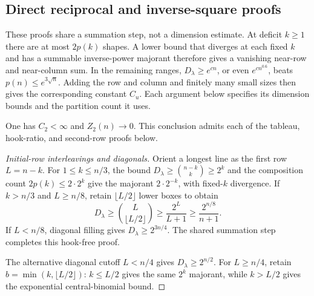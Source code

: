 \subsection{Direct reciprocal and inverse-square proofs}
\label{l:degree-direct-routes}

These proofs share a summation step, not a dimension estimate.
At deficit $k\ge1$ there are at most $2p(k)$ shapes. A lower bound
that diverges at each fixed $k$ and has a summable inverse-power
majorant therefore gives a vanishing near-row and near-column sum.
In the remaining ranges, $D_\lambda\ge e^{cn}$, or even
$e^{cn^{0.6}}$, beats $p(n)\le e^{3\sqrt n}$.
Adding the row and column and finitely many small sizes then gives
the corresponding constant $C_u$. Each argument below specifies
its dimension bounds and the partition count it uses.

\begin{lemma}
\label{l:degree-inverse-square}\label{l:degree-reciprocal-two}
One has $C_2<\infty$ and $Z_2(n)\to0$. This conclusion admits
each of the tableau, hook-ratio, and second-row proofs below.
\end{lemma}
\begin{proof}[Initial-row interleavings and diagonals]
Orient a longest line as the first row $L=n-k$.
For $1\le k\le n/3$, the bound
$D_\lambda\ge\binom{n-k}{k}\ge2^k$ and the composition count
$2p(k)\le2\cdot2^k$ give the majorant $2\cdot2^{-k}$,
with fixed-$k$ divergence. If $k>n/3$ and $L\ge n/8$, retain
$\lfloor L/2\rfloor$ lower boxes to obtain
\[
 D_\lambda\ge\binom L{\lfloor L/2\rfloor}
 \ge\frac{2^L}{L+1}\ge\frac{2^{n/8}}{n+1}.
\]
If $L<n/8$, diagonal filling gives $D_\lambda\ge2^{3n/4}$.
The shared summation step completes this hook-free proof.

The alternative diagonal cutoff $L<n/4$ gives $D_\lambda\ge2^{n/2}$.
For $L\ge n/4$, retain $b=\min(k,\lfloor L/2\rfloor)$:
$k\le L/2$ gives the same $2^k$ majorant, while $k>L/2$
gives the exponential central-binomial bound.
\end{proof}

